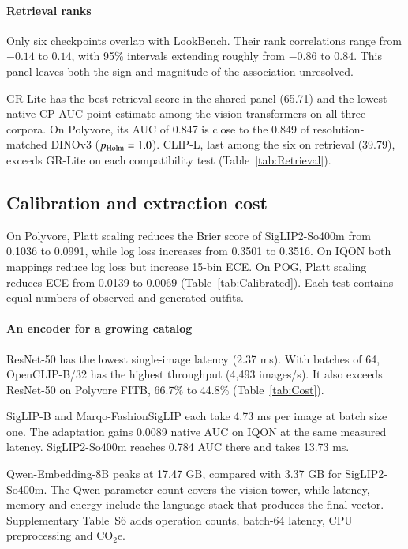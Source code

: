 \paragraph{Retrieval ranks}
Only six checkpoints overlap with LookBench. Their rank correlations range from $-0.14$ to $0.14$, with 95\% intervals extending roughly from $-0.86$ to $0.84$. This panel leaves both the sign and magnitude of the association unresolved.

\showRetrieval
GR-Lite has the best retrieval score in the shared panel (65.71) and the lowest native CP-AUC point estimate among the vision transformers on all three corpora. On Polyvore, its AUC of 0.847 is close to the 0.849 of resolution-matched DINOv3 ($p_{\rm Holm}=1.0$). CLIP-L, last among the six on retrieval (39.79), exceeds GR-Lite on each compatibility test (Table~\ref{tab:Retrieval}).

\subsection{Calibration and extraction cost}

\showCalibrated
On Polyvore, Platt scaling reduces the Brier score of SigLIP2-So400m from 0.1036 to 0.0991, while log loss increases from 0.3501 to 0.3516. On IQON both mappings reduce log loss but increase 15-bin ECE. On POG, Platt scaling reduces ECE from 0.0139 to 0.0069 (Table~\ref{tab:Calibrated}). Each test contains equal numbers of observed and generated outfits.


\paragraph{An encoder for a growing catalog}
\showCost
ResNet-50 has the lowest single-image latency (2.37 ms). With batches of 64, OpenCLIP-B/32 has the highest throughput (4,493 images/s). It also exceeds ResNet-50 on Polyvore FITB, 66.7\% to 44.8\% (Table~\ref{tab:Cost}).

SigLIP-B and Marqo-FashionSigLIP each take 4.73 ms per image at batch size one. The adaptation gains 0.0089 native AUC on IQON at the same measured latency. SigLIP2-So400m reaches 0.784 AUC there and takes 13.73 ms.

Qwen-Embedding-8B peaks at 17.47 GB, compared with 3.37 GB for SigLIP2-So400m. The Qwen parameter count covers the vision tower, while latency, memory and energy include the language stack that produces the final vector. Supplementary Table~S6 adds operation counts, batch-64 latency, CPU preprocessing and CO$_2$e.
